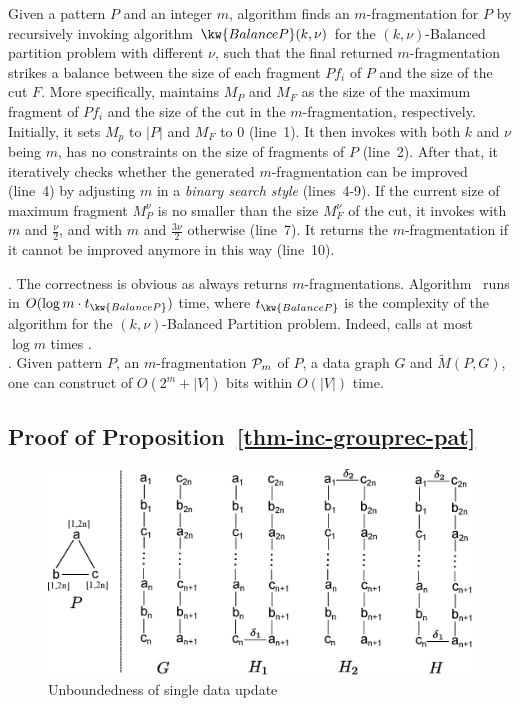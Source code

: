 Given a pattern $P$ and an integer $m$, algorithm  finds an $m$-fragmentation for $P$ by recursively invoking algorithm $\kw{BalanceP}(k,\nu)$ for the {\sc $(k,\nu)$-Balanced partition} problem with different $\nu$, such that the final returned $m$-fragmentation strikes a balance between the size of each fragment ${Pf}_i$ of $P$ and the size of the cut $F$.
More specifically,  maintains $M_P$ and $M_F$ as the size of the maximum fragment of ${Pf}_i$  and the size of the cut in the $m$-fragmentation, respectively. Initially, it sets $M_p$ to $|P|$ and $M_F$ to 0 (line~1).
It then invokes  with both $k$ and $\nu$ being $m$, \ie has no constraints on the size of fragments of $P$ (line~2).
After that, it iteratively checks whether the generated $m$-fragmentation can be improved (line~4) by adjusting $m$ in a {\em binary search style} (lines~4-9). If the current size of maximum fragment $M^\nu_P$ is no smaller than the size $M^\nu_F$ of the cut, it invokes  with $m$ and $\frac{\nu}{2}$, and with $m$ and $\frac{3\nu}{2}$ otherwise (line~7). It returns the $m$-fragmentation if it cannot be improved anymore in this way (line~10).

.
The correctness is obvious as  always returns $m$-fragmentations.
Algorithm~ runs in $O(\log m\cdot t_{\kw{BalanceP}})$ time, where $t_{\kw{BalanceP}}$ is the complexity of the algorithm for the {\sc $(k,\nu)$-Balanced Partition} problem. Indeed,  calls at most $\log m$ times .\\

. Given pattern $P$, an $m$-fragmentation ${\cal P}_{m}$ of $P$, a data
graph $G$ and $\tilde{M}(P,G)$, one can construct \matchindex of $O(2^{m} + |V|)$ bits
 within $O(|V|)$ time.


\subsection{Proof of Proposition~\ref{thm-inc-grouprec-pat}}


\begin{figure}[tb!]
\label{fig-inc-complexity-data}
\begin{center}
\includegraphics[scale=0.3]{./fig/inc-complexity-proof-data.eps}
\end{center}
\vspace{-3ex}
\caption{Unboundedness of single data update}
\vspace{-5ex}
\end{figure}

